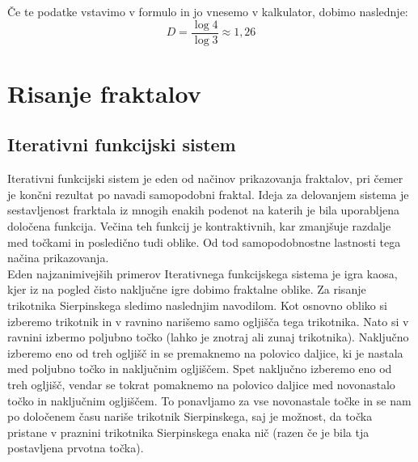 \documentclass[a4paper, 12px]{article}
\begin{document}
        \addvspace{0.5cm}
        Če te podatke vstavimo v formulo in jo vnesemo v kalkulator, dobimo naslednje:
        \[D=\frac{\log{4}}{\log{3}}\approx1,26\]

\section{Risanje fraktalov}
    \subsection{Iterativni funkcijski sistem}
        Iterativni funkcijski sistem je eden od načinov prikazovanja fraktalov, pri čemer je končni rezultat po navadi samopodobni fraktal.
        Ideja za delovanjem sistema je sestavljenost frarktala iz mnogih enakih podenot na katerih je bila uporabljena določena funkcija.
        Večina teh funkcij je kontraktivnih, kar zmanjšuje razdalje med točkami in posledično tudi oblike.
        Od tod samopodobnostne lastnosti tega načina prikazovanja.
        \cite{IFS}\\

        Eden najzanimivejših primerov Iterativnega funkcijskega sistema je igra kaosa, kjer iz na pogled čisto naključne igre dobimo fraktalne oblike.
        Za risanje trikotnika Sierpinskega sledimo naslednjim navodilom.
        Kot osnovno obliko si izberemo trikotnik in v ravnino narišemo samo ogljišča tega trikotnika.
        Nato si v ravnini izbermo poljubno točko (lahko je znotraj ali zunaj trikotnika).
        Naključno izberemo eno od treh ogljišč in se premaknemo na polovico daljice, ki je nastala med poljubno točko in naključnim ogljiščem.
        Spet naključno izberemo eno od treh ogljišč, vendar se tokrat pomaknemo na polovico daljice med novonastalo točko in naključnim ogljiščem.
        To ponavljamo za vse novonastale točke in se nam po določenem času nariše trikotnik Sierpinskega, saj je možnost, da točka pristane v praznini trikotnika Sierpinskega enaka nič (razen če je bila tja postavljena prvotna točka).
        \cite{ChaosGame}\\
\end{document}
